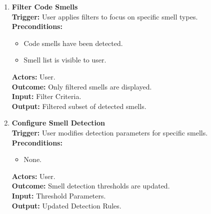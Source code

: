 \documentclass[12pt]{article}
\begin{document}
\begin{enumerate}[label={\bf PUC \arabic*:}, wide=0pt, font=\itshape]
  \item \textbf{Filter Code Smells} \\[2mm]
    \textbf{Trigger:} User applies filters to focus on specific smell types. \\[2mm]
    \textbf{Preconditions:}
    \begin{itemize}
      \item Code smells have been detected.
      \item Smell list is visible to user.
    \end{itemize}
    \textbf{Actors:} User. \\
    \textbf{Outcome:} Only filtered smells are displayed. \\
    \textbf{Input:} Filter Criteria. \\
    \textbf{Output:} Filtered subset of detected smells.

  \item \textbf{Configure Smell Detection} \\[2mm]
    \textbf{Trigger:} User modifies detection parameters for specific smells. \\[2mm]
    \textbf{Preconditions:}
    \begin{itemize}
      \item None.
    \end{itemize}
    \textbf{Actors:} User. \\
    \textbf{Outcome:} Smell detection thresholds are updated. \\
    \textbf{Input:} Threshold Parameters. \\
    \textbf{Output:} Updated Detection Rules.


\end{enumerate}
\end{document}
